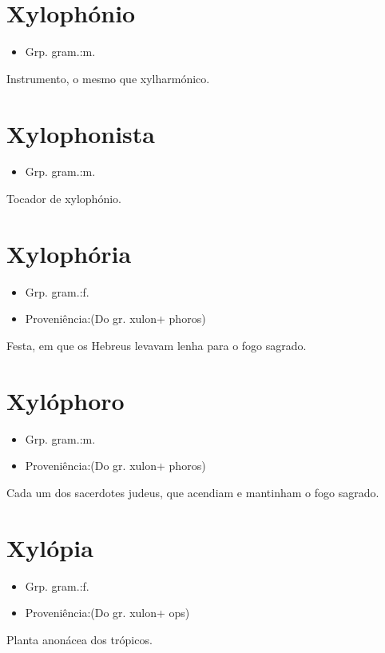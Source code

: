 \section{Xylophónio}
\begin{itemize}
\item {Grp. gram.:m.}
\end{itemize}
Instrumento, o mesmo que \textunderscore xylharmónico\textunderscore .
\section{Xylophonista}
\begin{itemize}
\item {Grp. gram.:m.}
\end{itemize}
Tocador de xylophónio.
\section{Xylophória}
\begin{itemize}
\item {Grp. gram.:f.}
\end{itemize}
\begin{itemize}
\item {Proveniência:(Do gr. \textunderscore xulon\textunderscore  + \textunderscore phoros\textunderscore )}
\end{itemize}
Festa, em que os Hebreus levavam lenha para o fogo sagrado.
\section{Xylóphoro}
\begin{itemize}
\item {Grp. gram.:m.}
\end{itemize}
\begin{itemize}
\item {Proveniência:(Do gr. \textunderscore xulon\textunderscore  + \textunderscore phoros\textunderscore )}
\end{itemize}
Cada um dos sacerdotes judeus, que acendiam e mantinham o fogo sagrado.
\section{Xylópia}
\begin{itemize}
\item {Grp. gram.:f.}
\end{itemize}
\begin{itemize}
\item {Proveniência:(Do gr. \textunderscore xulon\textunderscore  + \textunderscore ops\textunderscore )}
\end{itemize}
Planta anonácea dos trópicos.
